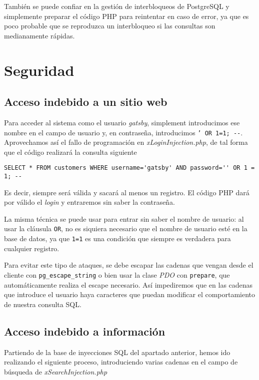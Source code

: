 \documentclass{article}
\begin{document}
También se puede confiar en la gestión de interbloqueos de PostgreSQL y simplemente preparar el código PHP para reintentar en caso de error, ya que es poco probable que se reproduzca un interbloqueo si las consultas son medianamente rápidas.

\section{Seguridad}

\subsection{Acceso indebido a un sitio web}

Para acceder al sistema como el usuario \textit{gatsby}, simplement introducimos ese nombre en el campo de usuario y, en contraseña, introducimos \texttt{' OR 1=1; {-}-}. Aprovechamos así el fallo de programación en \textit{xLoginInjection.php}, de tal forma que el código realizará la consulta siguiente

\begin{Verbatim}[frame = lines]
SELECT * FROM customers WHERE username='gatsby' AND password='' OR 1 = 1; --
\end{Verbatim}

Es decir, siempre será válida y sacará al menos un registro. El código PHP dará por válido el \textit{login} y entraremos sin saber la contraseña.

La misma técnica se puede usar para entrar sin saber el nombre de usuario: al usar la cláusula \texttt{OR}, no es siquiera necesario que el nombre de usuario esté en la base de datos, ya que \texttt{1=1} es una condición que siempre es verdadera para cualquier registro.

Para evitar este tipo de ataques, se debe escapar las cadenas que vengan desde el cliente con \texttt{pg\_escape\_string} o bien usar la clase \textit{PDO} con \texttt{prepare}, que automáticamente realiza el escape necesario. Así impediremos que en las cadenas que introduce el usuario haya caracteres que puedan modificar el comportamiento de nuestra consulta SQL.

\subsection{Acceso indebido a información}

Partiendo de la base de inyecciones SQL del apartado anterior, hemos ido realizando el siguiente proceso, introduciendo varias cadenas en el campo de búsqueda de \textit{xSearchInjection.php}
\end{document}
